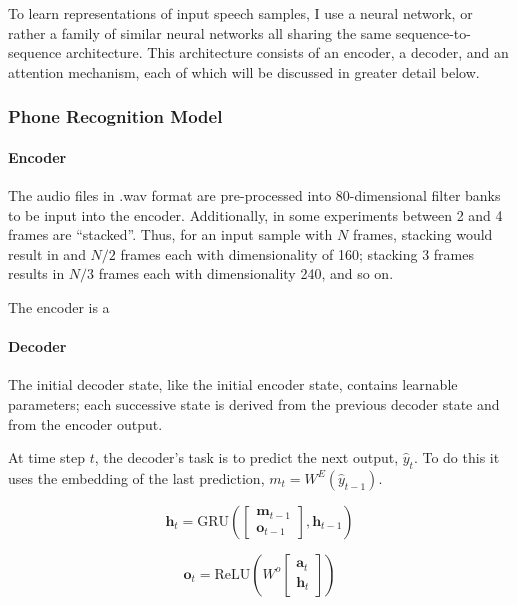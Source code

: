 To learn representations of input speech samples, I use a neural network, 
or rather a family of similar neural networks all sharing the same 
sequence-to-sequence architecture. This architecture consists of an 
encoder, a decoder, and an attention mechanism, each of which will be discussed 
in greater detail below.

\subsubsection{Phone Recognition Model}
\paragraph{Encoder} %
The audio files in .wav format are pre-processed into 80-dimensional filter
banks to be input into the encoder. Additionally, in some experiments between 
2 and 4 frames are ``stacked''. Thus, for an input sample with $N$ frames, 
stacking would result in and $N/2$ frames each with dimensionality of 160; 
stacking 3 frames results in $N/3$ frames each with dimensionality 240, and 
so on.

The encoder is a 


\paragraph{Decoder} %
The initial decoder state, like the initial encoder state, contains learnable 
parameters; each successive state is derived from the previous decoder state and 
from the encoder output.

At time step $t$, the decoder's task is to predict the next output, $\hat{y}_t$.
To do this it uses the embedding of the last prediction, $m_t = W^E(\hat{y}_{t-1})$.

$$ \textbf{h}_t = \textrm{GRU} \left( \begin{bmatrix}
    \textbf{m}_{t-1} \\ \textbf{o}_{t-1}
\end{bmatrix}, \textbf{h}_{t-1} \right)$$

$$ \textbf{o}_t =  \textrm{ReLU} \left( W^o \begin{bmatrix}
    \textbf{a}_t \\ \textbf{h}_t
\end{bmatrix} \right) $$

